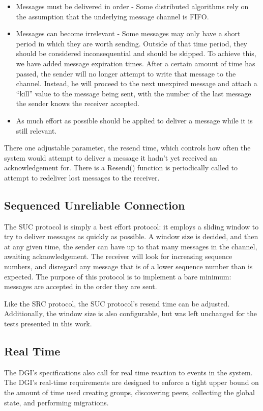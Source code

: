 \begin{itemize}
\item Messages must be delivered in order - Some distributed algorithms rely on 
the assumption that the underlying message channel is FIFO.
\item Messages can become irrelevant - Some messages may only have a short 
period in which they are worth sending. Outside of that time period, they 
should be considered inconsequential and should be skipped. To achieve this, we 
have added message expiration times. After a certain amount of time has passed, 
the sender will no longer attempt to write that message to the channel. 
Instead, he will proceed to the next unexpired message and attach a ``kill'' 
value to the message being sent, with the number of the last message the sender 
knows the receiver accepted.
\item As much effort as possible should be applied to deliver a message while 
it is still relevant.
\end{itemize}

There one adjustable parameter, the resend time, which controls how often the system would attempt to deliver a message it hadn't yet received an acknowledgement for. There is a Resend() function is periodically called to attempt to redeliver lost messages to the receiver. 

\subsection{Sequenced Unreliable Connection}

The SUC protocol is simply a best effort protocol: it employs a sliding window to try to deliver messages as quickly as possible. A window size is decided, and then at any given time, the sender can have up to that many messages in the channel, awaiting acknowledgement. The receiver will look for increasing sequence numbers, and disregard any message that is of a lower sequence number than is expected. The purpose of this protocol is to implement a bare minimum: messages are accepted in the order they are sent.

Like the SRC protocol, the SUC protocol's resend time can be adjusted. Additionally, the window size is also configurable, but was left unchanged for  the tests presented in this work.

\subsection{Real Time}
The DGI's specifications also call for real time reaction to events in the system. The DGI's real-time requirements are designed to enforce a tight upper bound on the amount of time used creating groups, discovering peers, collecting the global state, and performing migrations.

